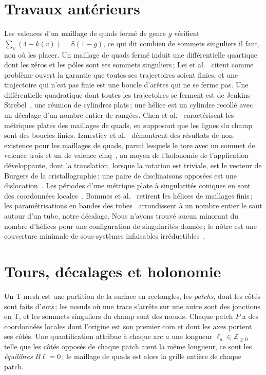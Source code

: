 \documentclass[11pt,a4paper]{article}
\newcommand{\Z}{\mathbb{Z}}
\begin{document}
\section{Travaux antérieurs}\label{sec:related}

Les valences d'un maillage de quads fermé de genre $g$ vérifient $\sum_v (4 -
k(v)) = 8(1-g)$, ce qui dit combien de sommets singuliers il faut, non où les
placer. Un maillage de quads fermé induit une différentielle quartique dont
les zéros et les pôles sont ses sommets singuliers\,; Lei et
al.~\cite{lei2020quartic} citent comme problème ouvert la garantie que toutes
ses trajectoires soient finies, et une trajectoire qui n'est pas finie est une
boucle d'arêtes qui ne se ferme pas. Une différentielle quadratique dont
toutes les trajectoires se ferment est de
Jenkins--Strebel~\cite{strebel1984quadratic}, une réunion de cylindres
plats\,; une hélice est un cylindre recollé avec un décalage d'un nombre
entier de rangées. Chen et al.~\cite{chen2019metric} caractérisent les
métriques plates des maillages de quads, en supposant que les lignes du champ
sont des boucles finies. Izmestiev et al.~\cite{izmestiev2013torus} démontrent
des résultats de non-existence pour les maillages de quads, parmi lesquels le
tore avec un sommet de valence trois et un de valence
cinq~\cite{barnette1971toroidal}, au moyen de l'holonomie de l'application
développante, dont la translation, lorsque la rotation est triviale, est le
vecteur de Burgers de la cristallographie\,; une paire de disclinaisons
opposées est une dislocation~\cite{kleman2008disclinations}. Les périodes
d'une métrique plate à singularités coniques en sont des coordonnées
locales~\cite{thurston1998shapes,veech1993flat}. Bommes et
al.~\cite{bommes2011structure} retirent les hélices de maillages finis\,; les
paramétrisations en bandes des tubes~\cite{kalberer2011stripe} arrondissent à
un nombre entier le saut autour d'un tube, notre décalage. Nous n'avons trouvé
aucun minorant du nombre d'hélices pour une configuration de singularités
donnée\,; le nôtre est une couverture minimale de sous-systèmes infaisables
irréductibles~\cite{parker1996iis,amaldi2003maxfs}.

\section{Tours, décalages et holonomie}\label{sec:setting}

Un T-mesh est une partition de la surface en rectangles, les \emph{patchs},
dont les côtés sont faits d'\emph{arcs}\,; les nœuds où une trace s'arrête sur
une autre sont des jonctions en T, et les sommets singuliers du champ sont des
nœuds. Chaque patch $P$ a des coordonnées locales dont l'origine est son
premier coin et dont les axes portent ses côtés. Une quantification attribue à
chaque arc $a$ une longueur $\ell_a \in \Z_{\ge 0}$ telle que les côtés
opposés de chaque patch aient la même longueur, ce sont les
\emph{équilibres} $B\ell = 0$\,; le maillage de quads est alors la grille
entière de chaque patch.
\end{document}
